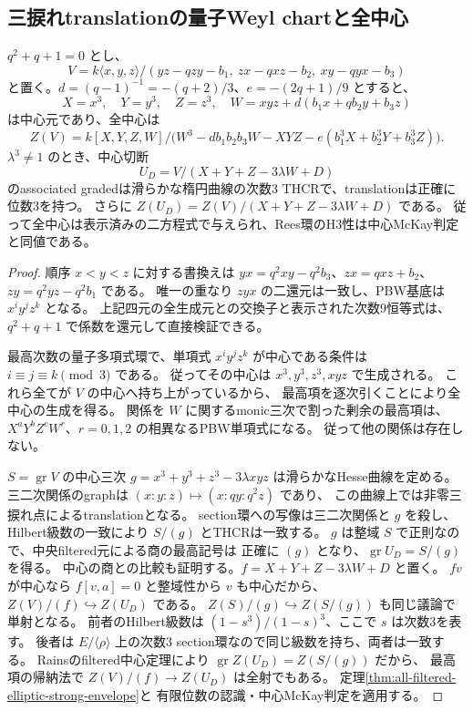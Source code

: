 \subsection{三捩れtranslationの量子Weyl chartと全中心}
\label{subsec:quantum3-center}
\begin{proposition}[三捩れchartの明示的な全中心]
\label{prop:quantum3-full-center}
$q^2+q+1=0$ とし、
\[
 V= k\langle x,y,z\rangle/(yz-qzy-b_1,\ zx-qxz-b_2,\ xy-qyx-b_3)
\]
と置く。$d=(q-1)^{-1}=-(q+2)/3$、$e=-(2q+1)/9$ とすると、
\[
 X=x^3,\quad Y=y^3,\quad Z=z^3,\quad
 W=xyz+d(b_1x+qb_2y+b_3z)
\]
は中心元であり、全中心は
\[
 Z(V)=k[X,Y,Z,W]/
 \bigl(W^3-db_1b_2b_3W-XYZ-e(b_1^3X+b_2^3Y+b_3^3Z)\bigr).
\]
$\lambda^3\ne1$ のとき、中心切断
\[
 U_D=V/(X+Y+Z-3\lambda W+D)
\]
のassociated gradedは滑らかな楕円曲線の次数3 THCRで、translationは正確に位数3を持つ。
さらに $Z(U_D)=Z(V)/(X+Y+Z-3\lambda W+D)$ である。
従って全中心は表示済みの二方程式で与えられ、Rees環のH3性は中心McKay判定と同値である。
\end{proposition}
\begin{proof}
順序 $x<y<z$ に対する書換えは
$yx=q^2xy-q^2b_3$、$zx=qxz+b_2$、$zy=q^2yz-q^2b_1$ である。
唯一の重なり $zyx$ の二還元は一致し、PBW基底は $x^iy^jz^k$ となる。
上記四元の全生成元との交換子と表示された次数9恒等式は、
$q^2+q+1$ で係数を還元して直接検証できる。

最高次数の量子多項式環で、単項式 $x^iy^jz^k$ が中心である条件は
$i\equiv j\equiv k\pmod3$ である。
従ってその中心は $x^3,y^3,z^3,xyz$ で生成される。
これら全てが $V$ の中心へ持ち上がっているから、
最高項を逐次引くことにより全中心の生成を得る。
関係を $W$ に関するmonic三次で割った剰余の最高項は、
$X^aY^bZ^cW^r$、$r=0,1,2$ の相異なるPBW単項式になる。
従って他の関係は存在しない。

$S=\operatorname{gr}V$ の中心三次
$g=x^3+y^3+z^3-3\lambda xyz$ は滑らかなHesse曲線を定める。
三二次関係のgraphは $(x:y:z)\mapsto(x:qy:q^2z)$ であり、
この曲線上では非零三捩れ点によるtranslationとなる。
section環への写像は三二次関係と $g$ を殺し、
Hilbert級数の一致により $S/(g)$ とTHCRは一致する。
$g$ は整域 $S$ で正則なので、中央filtered元による商の最高記号は
正確に $(g)$ となり、$\operatorname{gr}U_D=S/(g)$ を得る。
中心の商との比較も証明する。$f=X+Y+Z-3\lambda W+D$ と置く。
$fv$ が中心なら $f[v,a]=0$ と整域性から $v$ も中心だから、
$Z(V)/(f)\hookrightarrow Z(U_D)$ である。
$Z(S)/(g)\hookrightarrow Z(S/(g))$ も同じ議論で単射となる。
前者のHilbert級数は $(1-s^3)/(1-s)^3$、ここで $s$ は次数3を表す。
後者は $E/\langle\rho\rangle$ 上の次数3 section環なので同じ級数を持ち、両者は一致する。
Rainsのfiltered中心定理により $\operatorname{gr}Z(U_D)=Z(S/(g))$ だから、
最高項の帰納法で $Z(V)/(f)\to Z(U_D)$ は全射でもある。
定理\ref{thm:all-filtered-elliptic-strong-envelope}と
有限位数の認識・中心McKay判定を適用する。
\end{proof}

